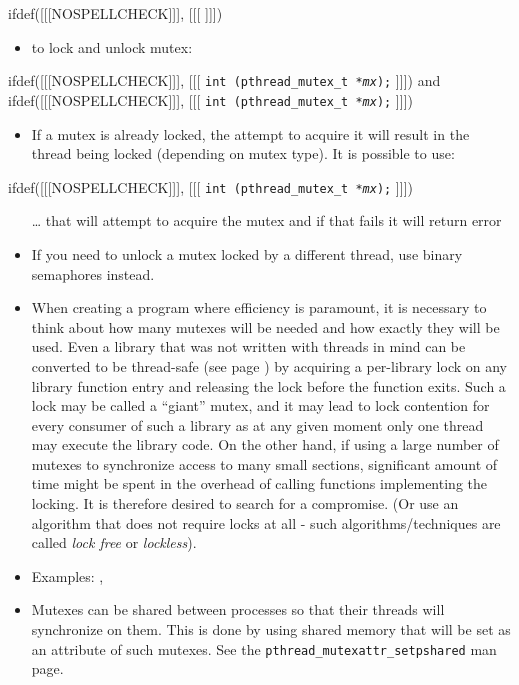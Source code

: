 ifdef([[[NOSPELLCHECK]]], [[[
]]])

\begin{slide}

\begin{itemize}
\item to lock and unlock mutex:
\end{itemize}
ifdef([[[NOSPELLCHECK]]], [[[
\texttt{int (pthread\_mutex\_t *\emph{mx});}
]]])
and
ifdef([[[NOSPELLCHECK]]], [[[
\texttt{int (pthread\_mutex\_t *\emph{mx});}
]]])
\begin{itemize}
\item If a mutex is already locked, the attempt to acquire it will result
in the thread being locked (depending on mutex type).
It is possible to use:
\end{itemize}
ifdef([[[NOSPELLCHECK]]], [[[
\texttt{int (pthread\_mutex\_t *\emph{mx});}
]]])
\begin{itemize}
\item[\dots] that will attempt to acquire the mutex and if that fails it will
return error
\end{itemize}
\end{slide}


\begin{itemize}
\item If you need to unlock a mutex locked by a different thread, use binary
semaphores instead.
\item When creating a program where efficiency is paramount, it is necessary to
think about how many mutexes will be needed and how exactly they will be used.
Even a library that was not written with threads in mind can be converted to be
thread-safe (see page \pageref{THREADSAFE}) by acquiring a per-library lock on
any library function entry and releasing the lock before the function exits.
Such a lock may be called a ``giant'' mutex, and it may lead to lock contention
for every consumer of such a library as at any given moment only one thread may
execute the library code.  On the other hand, if using a large number of mutexes
to synchronize access to many small sections, significant amount of time might
be spent in the overhead of calling functions implementing the locking.  It is
therefore desired to search for a compromise.  (Or use an algorithm that does
not require locks at all - such algorithms/techniques are called \emph{lock
free} or \emph{lockless}).
\item {} Examples: ,
\item Mutexes can be shared between processes so that their threads will
synchronize on them. This is done by using shared memory that will be set as an
attribute of such mutexes. See the
\texttt{pthread\_mutexattr\_setpshared} man page.
\end{itemize}


